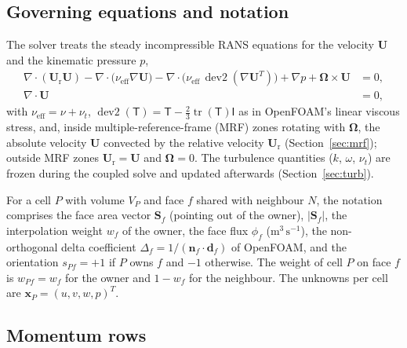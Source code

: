 \documentclass[11pt,a4paper]{article}
\newcommand{\vect}[1]{\mathbf{#1}}
\newcommand{\Uv}{\vect{U}}
\newcommand{\Sf}{\vect{S}_f}
\begin{document}
\subsection{Governing equations and notation}

The solver treats the steady incompressible RANS equations for the velocity $\Uv$ and
the kinematic pressure $p$,
\begin{align}
  \nabla\cdot(\Uv_{\mathrm{r}}\Uv)
  - \nabla\cdot\bigl(\nu_{\mathrm{eff}}\nabla\Uv\bigr)
  - \nabla\cdot\bigl(\nu_{\mathrm{eff}}\,\operatorname{dev2}(\nabla\Uv^{T})\bigr)
  + \nabla p + \vect{\Omega}\times\Uv &= 0, \label{eq:mom}\\
  \nabla\cdot\Uv &= 0, \label{eq:cont}
\end{align}
with $\nu_{\mathrm{eff}}=\nu+\nu_t$, $\operatorname{dev2}(\mathsf{T}) =
\mathsf{T}-\tfrac{2}{3}\operatorname{tr}(\mathsf{T})\mathsf{I}$ as in
OpenFOAM's linear viscous stress, and, inside multiple-reference-frame (MRF)
zones rotating with $\vect\Omega$, the absolute velocity $\Uv$ convected by the
relative velocity $\Uv_{\mathrm{r}}$ (Section~\ref{sec:mrf}); outside MRF
zones $\Uv_{\mathrm{r}}=\Uv$ and $\vect\Omega=0$. The turbulence quantities
($k$, $\omega$, $\nu_t$) are frozen during the coupled solve and updated
afterwards (Section~\ref{sec:turb}).

For a cell $P$ with volume $V_P$ and face $f$ shared with neighbour $N$, the notation comprises
the face area vector $\Sf$ (pointing out of the owner), $|\Sf|$, the
interpolation weight $w_f$ of the owner, the face flux $\phi_f$
($\mathrm{m^3\,s^{-1}}$), the non-orthogonal delta coefficient
$\Delta_f = 1/(\vect{n}_f\cdot\vect{d}_f)$ of OpenFOAM, and the orientation
$s_{Pf}=+1$ if $P$ owns $f$ and $-1$ otherwise. The weight of cell $P$ on face
$f$ is $w_{Pf}=w_f$ for the owner and $1-w_f$ for the neighbour. The unknowns
per cell are $\vect{x}_P=(u,v,w,p)^T$.

\subsection{Momentum rows}
\end{document}
